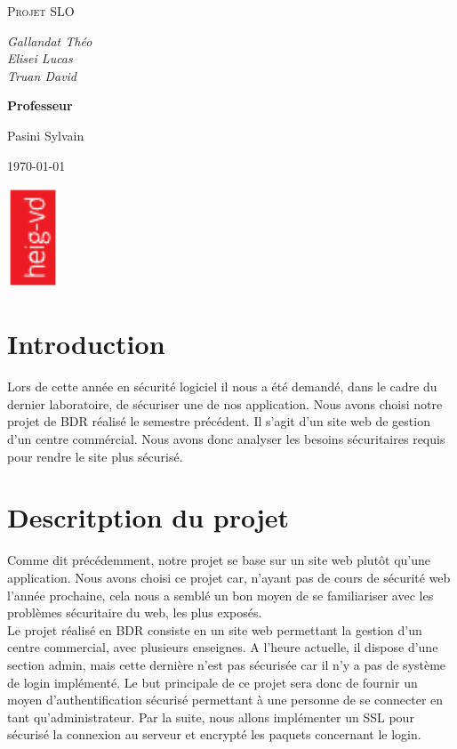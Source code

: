 \documentclass[a4paper]{article}
\date{\today}
\begin{document}
\thispagestyle{empty}

\begin{titlepage}
\center

    \vspace{1cm}
    {\scshape\LARGE Projet SLO \\ 
        \vspace{0.5cm}}

    \vspace{0.5cm}
    {\itshape Gallandat Théo \\ Elisei Lucas \\ Truan David\par}

    \vspace{1cm}
    \textbf{Professeur}\par
    Pasini Sylvain\par
    \vspace{3cm}

    {\large \today\par}
    \vspace{3cm}
    \includegraphics[height=3cm,angle=-90]{img/logo-HEIG-VD.pdf}
\end{titlepage}
\setcounter{page}{1}
\section{Introduction}
Lors de cette année en sécurité logiciel il nous a été demandé, dans le cadre du dernier laboratoire, de sécuriser une de nos application. Nous avons choisi notre projet de BDR réalisé le semestre précédent. Il s'agit d'un site web de gestion d'un centre commércial. Nous avons donc analyser les besoins sécuritaires requis pour rendre le site plus sécurisé.
\section{Descritption du projet}
Comme dit précédemment, notre projet se base sur un site web plutôt qu'une application. Nous avons choisi ce projet car, n'ayant pas de cours de sécurité web l'année prochaine, cela nous a semblé un bon moyen de se familiariser avec les problèmes sécuritaire du web, les plus exposés.\\
Le projet réalisé en BDR consiste en un site web permettant la gestion d'un centre commercial, avec plusieurs enseignes. A l'heure actuelle, il dispose d'une section admin, mais cette dernière n'est pas sécurisée car il n'y a pas de système de login implémenté. Le but principale de ce projet sera donc de fournir un moyen d'authentification sécurisé permettant à une personne de se connecter en tant qu'administrateur. Par la suite, nous allons implémenter un SSL pour sécurisé la connexion au serveur et encrypté les paquets concernant le login.
\end{document}
